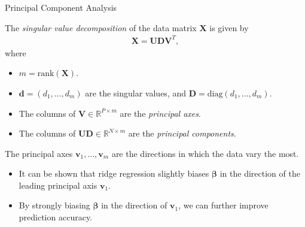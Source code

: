 \documentclass[8pt]{beamer}
\newcommand{\mys}{\vspace{0.5cm} %
}
\begin{document}
\begin{frame}{\color{white} Principal Component Analysis}

The \textit{singular value decomposition} of the data matrix $\mathbf{X}$ is given by 
\begin{align}
    \label{SVD}
    \mathbf{X} = \mathbf{U} \mathbf{D} \mathbf{V}^T,
\end{align}
where 
\begin{itemize}
    \item $m = \mathrm{rank}(\mathbf{X})$.
    \item $\bm{d} = (d_1, \ldots, d_m)$ are the singular values, and $\mathbf{D} = \mathrm{diag}(d_1, \ldots, d_m)$.
    \item The columns of $\mathbf{V} \in \mathbb{R}^{P \times m}$ are the \textit{principal axes}.
    \item The columns of $\mathbf{U} \mathbf{D} \in \mathbb{R}^{N \times m}$ are the \textit{principal components}.
\end{itemize} \mys

The principal axes $\bm{v}_1, \ldots, \bm{v}_m$ are the directions in which the data vary the most.
\begin{itemize}
    \item It can be shown that ridge regression slightly biases $\bm{\beta}$ in the direction of the leading principal axis $\bm{v}_1$.
    \item By strongly biasing $\bm{\beta}$ in the direction of $\bm{v}_1$, we can further improve prediction accuracy.
\end{itemize}
    
\end{frame}
\end{document}
